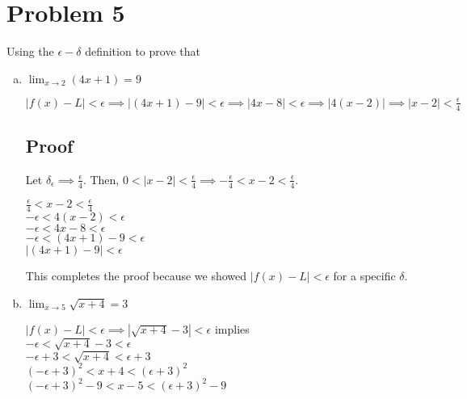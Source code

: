 \documentclass{article}
\newcommand\abs[1]{\left|#1\right|}
\begin{document}
\section*{Problem 5}
\begin{flushleft}
Using the \textquotedbl$\epsilon - \delta$\textquotedbl \hspace{.01cm} definition to prove that \\
\begin{enumerate}[(a)]
\item $\displaystyle \lim_{x \to 2} (4x+1) = 9$

\begin{center}
$\abs{f(x) - L} < \epsilon \implies \abs{(4x+1) - 9} < \epsilon \implies \abs{4x-8} < \epsilon \implies  \abs{4(x-2)} \implies \abs{x-2} < \frac{\epsilon}{4}$ \\
\end{center}

\subsection*{Proof}

Let $\delta_\epsilon \implies \frac{\epsilon}{4}$. Then, $0 < \abs{x-2} < \frac{\epsilon}{4} \implies -\frac{\epsilon}{4} < x-2 < \frac{\epsilon}{4}$. \\
\begin{center}
\vspace{.2cm}
$\frac{\epsilon}{4} < x-2 < \frac{\epsilon}{4}$ \\
\vspace{.2cm}
$-\epsilon < 4(x-2) < \epsilon$ \\
\vspace{.2cm}
$-\epsilon < 4x-8 < \epsilon$ \\
\vspace{.2cm}
$-\epsilon < (4x+1)-9 < \epsilon$ \\
\vspace{.2cm}
$\abs{(4x+1)-9} < \epsilon$ \\
\end{center}

This completes the proof because we showed $\abs{f(x) - L} < \epsilon$ for a specific $\delta$. \\

\item $\displaystyle \lim_{x \to 5} \sqrt{x + 4} = 3$

\begin{center}
$\abs{f(x) - L} < \epsilon \implies \abs{\sqrt{x + 4} - 3} < \epsilon$ implies \\
\vspace{.3cm}
$-\epsilon < \sqrt{x + 4} - 3 < \epsilon$ \\
\vspace{.2cm}
$-\epsilon  + 3< \sqrt{x + 4} < \epsilon + 3$ \\
\vspace{.2cm}
$(-\epsilon  + 3)^2 < x + 4 < (\epsilon + 3)^2$ \\
\vspace{.2cm}
$(-\epsilon  + 3)^2 - 9 < x - 5 < (\epsilon + 3)^2 - 9$ \\
\end{center}


\end{enumerate}
\end{flushleft}
\end{document}
